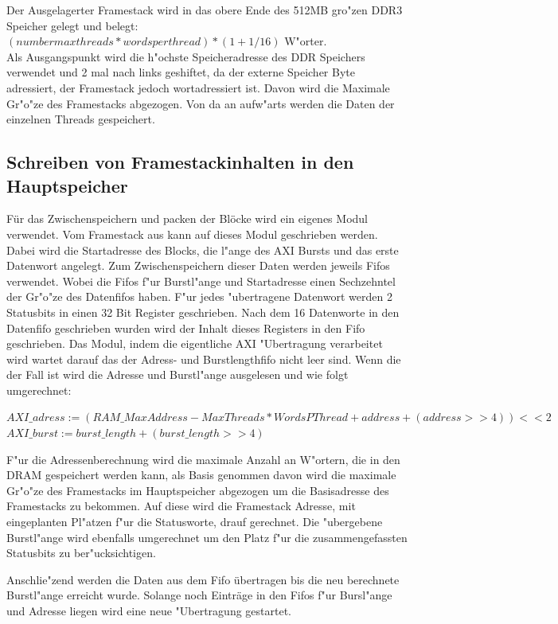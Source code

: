 Der Ausgelagerter Framestack wird in das obere Ende des 512MB gro"zen DDR3 Speicher gelegt und belegt:\\ $(number max threads * words per thread)*(1+1/16) $ W"orter.\\
Als Ausgangspunkt wird die h"ochste Speicheradresse des DDR Speichers verwendet und 2 mal nach links geshiftet, da der externe Speicher Byte adressiert, der Framestack jedoch wortadressiert ist. Davon wird die Maximale Gr"o"ze des Framestacks abgezogen. Von da an aufw"arts werden die Daten der einzelnen Threads gespeichert.

\subsection{Schreiben von Framestackinhalten in den Hauptspeicher}
F\"ur das Zwischenspeichern und packen der Bl\"ocke wird ein eigenes Modul verwendet.
Vom Framestack aus kann auf dieses Modul geschrieben werden. Dabei wird die Startadresse des Blocks, die l"ange des AXI Bursts und das erste Datenwort angelegt. Zum Zwischenspeichern dieser Daten werden jeweils Fifos verwendet. Wobei die Fifos f"ur Burstl"ange und Startadresse einen Sechzehntel der Gr"o{"z}e des Datenfifos haben. F"ur jedes "ubertragene Datenwort werden 2 Statusbits in einen 32 Bit Register geschrieben. Nach dem 16 Datenworte in den Datenfifo geschrieben wurden wird der Inhalt dieses Registers in den Fifo geschrieben. 
Das Modul, indem die eigentliche AXI "Ubertragung verarbeitet wird wartet darauf das der Adress- und Burstlengthfifo nicht leer sind. Wenn die der Fall ist wird die Adresse und Burstl"ange ausgelesen und wie folgt umgerechnet:

$AXI\_adress := (RAM\_MaxAddress - MaxThreads*WordsPThread + address +(address >> 4))<<2$
$AXI\_burst := burst\_length + (burst\_length >> 4)$

F"ur die Adressenberechnung wird die maximale Anzahl an W"ortern, die in den DRAM gespeichert werden kann, als Basis genommen davon wird die maximale Gr"o"ze des Framestacks im Hauptspeicher abgezogen um die Basisadresse des Framestacks zu bekommen. Auf diese wird die Framestack Adresse, mit eingeplanten Pl"atzen f"ur die Statusworte, drauf gerechnet. 
Die "ubergebene Burstl"ange wird ebenfalls umgerechnet um den Platz f"ur die zusammengefassten Statusbits zu ber"ucksichtigen.

Anschlie"zend werden die Daten aus dem Fifo \"ubertragen bis die neu berechnete Burstl"ange erreicht wurde. Solange noch Eintr\"age in den Fifos f"ur Bursl"ange und Adresse liegen wird eine neue "Ubertragung gestartet. 

